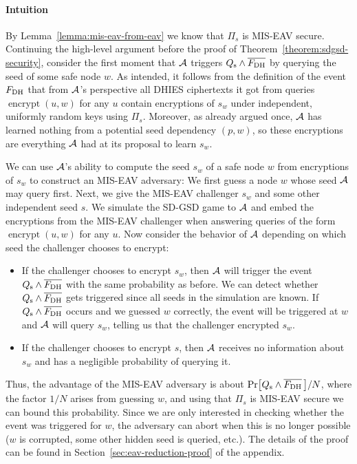 \paragraph{Intuition} By Lemma~\ref{lemma:mis-eav-from-eav} we know that $\Pi_s$ is MIS-EAV secure. Continuing the high-level argument before the proof of Theorem~\ref{theorem:sdgsd-security}, consider the first moment that $\mathcal{A}$ triggers $Q_\mathrm{s} \land \overline{F_\mathrm{DH}}$ by querying the seed of some safe node $w$.  As intended, it follows from the definition of the event $F_\mathrm{DH}$ that from $\mathcal{A}$'s perspective all DHIES ciphertexts it got from queries $\operatorname{encrypt}(u, w)$ for any $u$ contain encryptions of $s_w$ under independent, uniformly random keys using $\Pi_s$. Moreover, as already argued once, $\mathcal{A}$ has learned nothing from a potential seed dependency $(p, w)$, so these encryptions are everything $\mathcal{A}$ had at its proposal to learn $s_w$.

We can use $\mathcal{A}$'s ability to compute the seed $s_w$ of a safe node $w$ from encryptions of $s_w$ to construct an MIS-EAV adversary: We first guess a node $w$ whose seed $\mathcal{A}$ may query first. Next, we give the MIS-EAV challenger $s_w$ and some other independent seed $s$. We simulate the SD-GSD game to $\mathcal{A}$ and embed the encryptions from the MIS-EAV challenger when answering queries of the form $\operatorname{encrypt}(u, w)$ for any $u$. Now consider the behavior of $\mathcal{A}$ depending on which seed the challenger chooses to encrypt:
\begin{itemize}
	\item If the challenger chooses to encrypt $s_w$, then $\mathcal{A}$ will trigger the event $Q_\mathrm{s} \land \overline{F_\mathrm{DH}}$ with the same probability as before. We can detect whether $Q_\mathrm{s} \land \overline{F_\mathrm{DH}}$ gets triggered since all seeds in the simulation are known. If $Q_\mathrm{s} \land \overline{F_\mathrm{DH}}$ occurs and we guessed $w$ correctly, the event will be triggered at $w$ and $\mathcal{A}$ will query $s_w$, telling us that the challenger encrypted $s_w$.
	\item If the challenger chooses to encrypt $s$, then $\mathcal{A}$ receives no information about $s_w$ and has a negligible probability of querying it.
\end{itemize}
Thus, the advantage of the MIS-EAV adversary is about $\pr{\qs \land \overline{\fdh}\,}/N$, where the factor $1/N$ arises from guessing $w$, and using that $\Pi_s$ is MIS-EAV secure we can bound this probability. Since we are only interested in checking whether the event was triggered for $w$, the adversary can abort when this is no longer possible ($w$ is corrupted, some other hidden seed is queried, etc.). The details of the proof can be found in Section~\ref{sec:eav-reduction-proof} of the appendix.

